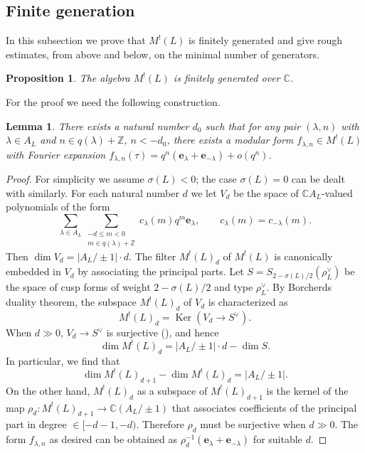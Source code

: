 \documentclass[12pt]{amsart}
\numberwithin{equation}{section}
\newtheorem{proposition}[theorem]{Proposition}
\newtheorem{lemma}[theorem]{Lemma}
\theoremstyle{definition}
\theoremstyle{remark}
\renewcommand{\ker}{\operatorname{Ker}}
\newcommand{\Z}{\mathbb{Z}}
\newcommand{\C}{\mathbb{C}}
\newcommand{\elambda}{{\mathbf e}_{\lambda}}
\newcommand{\ML}{M^{!}(L)}
\begin{document}
\subsection{Finite generation}\label{ssec: f.g.}

In this subsection we prove that ${\ML}$ is finitely generated and 
give rough estimates, from above and below, 
on the minimal number of generators. 

\begin{proposition}\label{prop: f.g.}
The algebra ${\ML}$ is finitely generated over ${\C}$. 
\end{proposition}

For the proof we need the following construction. 

\begin{lemma}\label{lem: leading term}
There exists a natural number $d_{0}$ such that 
for any pair $(\lambda, n)$ with 
$\lambda\in A_{L}$ and $n\in q(\lambda)+{\Z}$, $n<-d_{0}$,  
there exists a modular form $f_{\lambda,n}\in {\ML}$ with Fourier expansion 
$f_{\lambda,n}(\tau)=q^{n}({\elambda}+\mathbf{e}_{-\lambda})+o(q^{n})$. 
\end{lemma}

\begin{proof}
For simplicity we assume $\sigma(L)<0$; 
the case $\sigma(L)=0$ can be dealt with similarly. 
For each natural number $d$ we let $V_{d}$ be 
the space of ${\C}A_{L}$-valued polynomials of the form 
\begin{equation}\label{eqn: principal part}
\sum_{\lambda\in A_{L}} 
\sum_{\substack{-d\leq m <0 \\ m\in q(\lambda)+{\Z}}} 
c_{\lambda}(m)q^{m}{\elambda}, \qquad 
c_{\lambda}(m) = c_{-\lambda}(m).  
\end{equation}
Then $\dim V_{d} = |A_{L}/\pm 1|\cdot d$. 
The filter $M^{!}(L)_{d}$ of ${\ML}$ is canonically embedded in $V_{d}$ 
by associating the principal parts. 
Let $S=S_{2-\sigma(L)/2}(\rho_{L}^{\vee})$ 
be the space of cusp forms of weight $2-\sigma(L)/2$ and type $\rho_{L}^{\vee}$. 
By Borcherds duality theorem, 
the subspace $M^{!}(L)_{d}$ of $V_{d}$ is characterized as 
\begin{equation*}
M^{!}(L)_{d} = {\ker}(V_{d}\to S^{\vee}). 
\end{equation*}
When $d\gg 0$, 
$V_{d}\to S^{\vee}$ is surjective (\cite{Bo00a}), 
and hence 
\begin{equation*}
\dim M^{!}(L)_{d} = |A_L/\pm 1|\cdot d - \dim S. 
\end{equation*}
In particular, we find that 
\begin{equation*}
\dim M^{!}(L)_{d+1} - \dim M^{!}(L)_{d} = |A_{L}/\pm 1|. 
\end{equation*}
On the other hand, 
$M^{!}(L)_{d}$ as a subspace of $M^{!}(L)_{d+1}$ 
is the kernel of the map 
$\rho_{d}\colon M^{!}(L)_{d+1} \to {\C}(A_{L}/\pm 1)$ 
that associates coefficients of the principal part in degree $\in [-d-1, -d)$. 
Therefore $\rho_{d}$ must be surjective when $d\gg 0$. 
The form $f_{\lambda,n}$ as desired can be obtained as 
$\rho_{d}^{-1}({\elambda}+\mathbf{e}_{-\lambda})$ for suitable $d$. 
\end{proof}
\end{document}
